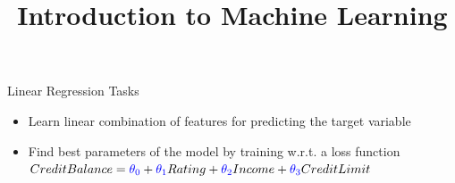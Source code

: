\documentclass[11pt,compress,t,notes=noshow, xcolor=table]{beamer}
\title{Introduction to Machine Learning}
\begin{document}

\sloppy

\begin{vbframe}{Linear Regression Tasks}
\begin{itemize}
\item \small Learn linear combination of features for predicting the target variable
\item \small Find best parameters of the model by training w.r.t. a loss function $Credit Balance = \textcolor{blue}{\theta_0} + \textcolor{blue}{\theta_1}Rating + \textcolor{blue}{\theta_2}Income + \textcolor{blue}{\theta_3}Credit Limit$

\end{itemize}


\end{vbframe}
\end{document}
